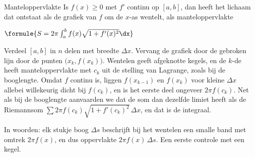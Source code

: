 
\begin{theorie}
\begin{stelling}{Manteloppervlakte}
Is $f(x) \geqslant 0$ met $f'$ continu op $[a, b]$, dan heeft het lichaam dat ontstaat als de grafiek van $f$ om de $x$-as wentelt, als manteloppervlakte

\vspace{1mm}
\qquad $\formule{S = 2\pi\int_a^b f(x)\sqrt{1 + f'(x)^2}\dx}$
\end{stelling}

\begin{bewijs}
Verdeel $[a, b]$ in $n$ delen met breedte $\Delta x$. Vervang de grafiek door de gebroken lijn door de punten $\bigl(x_k, f(x_k)\bigr)$. Wentelen geeft afgeknotte kegels, en de $k$-de heeft manteloppervlakte
met $c_k$ uit de stelling van Lagrange, zoals bij de booglengte. Omdat $f$ continu is, liggen $f(x_{k-1})$ en $f(x_k)$ voor kleine $\Delta x$ allebei willekeurig dicht bij $f(c_k)$, en is het eerste deel ongeveer $2\pi f(c_k)$. Net als bij de booglengte aanvaarden we dat de som dan dezelfde limiet heeft als de Riemannsom $\sum 2\pi f(c_k)\sqrt{1 + f'(c_k)^2}\,\Delta x$, en dat is de integraal.
\end{bewijs}
\end{theorie}

In woorden: elk stukje boog $\Delta s$ beschrijft bij het wentelen een smalle band met omtrek $2\pi f(x)$, en dus oppervlakte $2\pi f(x)\,\Delta s$. Een eerste controle met een kegel.

